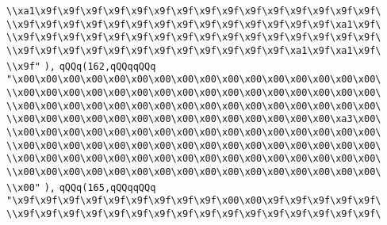\verb|\\xa1\x9f\x9f\x9f\x9f\x9f\x9f\x9f\x9f\x9f\x9f\x9f\x9f\x9f\x9f\x9f\|\newline
\verb|\\x9f\x9f\x9f\x9f\x9f\x9f\x9f\x9f\x9f\x9f\x9f\x9f\x9f\x9f\xa1\x9f\|\newline
\verb|\\x9f\x9f\x9f\x9f\x9f\x9f\x9f\x9f\x9f\x9f\x9f\x9f\x9f\x9f\x9f\x9f\|\newline
\verb|\\x9f\x9f\x9f\x9f\x9f\x9f\x9f\x9f\x9f\x9f\x9f\x9f\xa1\x9f\xa1\x9f\|\newline
\verb|\\x9f"|\newline
\verb|),|\newline
\verb|qQQq(162,qQQqqQQq|\newline
\verb|"\x00\x00\x00\x00\x00\x00\x00\x00\x00\x00\x00\x00\x00\x00\x00\x00\|\newline
\verb|\\x00\x00\x00\x00\x00\x00\x00\x00\x00\x00\x00\x00\x00\x00\x00\x00\|\newline
\verb|\\x00\x00\x00\x00\x00\x00\x00\x00\x00\x00\x00\x00\x00\x00\x00\x00\|\newline
\verb|\\x00\x00\x00\x00\x00\x00\x00\x00\x00\x00\x00\x00\x00\x00\xa3\x00\|\newline
\verb|\\x00\x00\x00\x00\x00\x00\x00\x00\x00\x00\x00\x00\x00\x00\x00\x00\|\newline
\verb|\\x00\x00\x00\x00\x00\x00\x00\x00\x00\x00\x00\x00\x00\x00\x00\x00\|\newline
\verb|\\x00\x00\x00\x00\x00\x00\x00\x00\x00\x00\x00\x00\x00\x00\x00\x00\|\newline
\verb|\\x00\x00\x00\x00\x00\x00\x00\x00\x00\x00\x00\x00\x00\x00\x00\x00\|\newline
\verb|\\x00"|\newline
\verb|),|\newline
\verb|qQQq(165,qQQqqQQq|\newline
\verb|"\x9f\x9f\x9f\x9f\x9f\x9f\x9f\x9f\x9f\x00\x00\x9f\x9f\x9f\x9f\x9f\|\newline
\verb|\\x9f\x9f\x9f\x9f\x9f\x9f\x9f\x9f\x9f\x9f\x9f\x9f\x9f\x9f\x9f\x9f\|\newline
